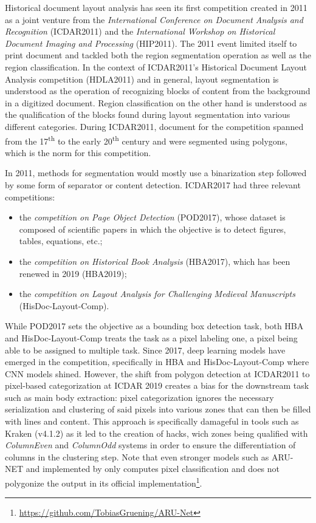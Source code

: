 \documentclass{jdmdh}
\begin{document}
Historical document layout analysis has seen its first competition created in 2011 as a joint venture from the \textit{International Conference on Document Analysis and Recognition} (ICDAR2011) and the \textit{International Workshop on Historical Document Imaging and Processing} (HIP2011). The 2011 event limited itself to print document and tackled both the region segmentation operation as well as the region classification. In the context of ICDAR2011's Historical Document Layout Analysis competition (HDLA2011) and in general, layout segmentation is understood as the operation of recognizing blocks of content from the background in a digitized document. Region classification on the other hand is understood as the qualification of the blocks found during layout segmentation into various different categories. During ICDAR2011, document for the competition spanned from the 17\textsuperscript{th} to the early 20\textsuperscript{th} century and were segmented using polygons, which is the norm for this competition.

In 2011, methods for segmentation would mostly use a binarization step followed by some form of separator or content detection. 
ICDAR2017 had three relevant competitions:
\begin{itemize}
    \item the \textit{competition on Page Object Detection} (POD2017), whose dataset is composed of scientific papers in which the objective is to detect figures, tables, equations, etc.;
    \item the \textit{competition on Historical Book Analysis} (HBA2017), which has been renewed in 2019 (HBA2019);
    \item the \textit{competition on Layout Analysis for Challenging Medieval Manuscripts} (HisDoc-Layout-Comp).
\end{itemize}

While POD2017 sets the objective as a bounding box detection task, both HBA and HisDoc-Layout-Comp treats the task as a pixel labeling one, a pixel being able to be assigned to multiple task. Since 2017, deep learning models have emerged in the competition, specifically in HBA and HisDoc-Layout-Comp where CNN models shined. However, the shift from polygon detection at ICDAR2011 to pixel-based categorization at ICDAR 2019 creates a bias for the downstream task such as main body extraction: pixel categorization ignores the necessary serialization and clustering of said pixels into various zones that can then be filled with lines and content. This approach is specifically damageful in tools such as Kraken (v4.1.2) as it led to the creation of hacks, wich zones being qualified with \textit{ColumnEven} and \textit{ColumnOdd} systems in order to ensure the differentiation of columns in the clustering step. Note that even stronger models such as ARU-NET and implemented by \citet{gruning2018arunet} only computes pixel classification and does not polygonize the output in its official implementation\footnote{\url{https://github.com/TobiasGruening/ARU-Net}}.
\end{document}
